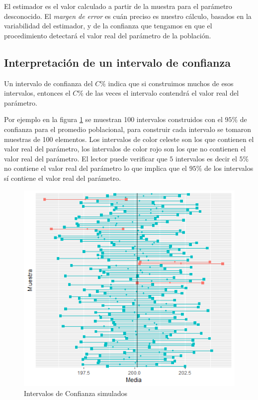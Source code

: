 \documentclass[]{book}
\begin{document}
El estimador es el valor calculado a partir de la muestra para el parámetro desconocido. El \emph{margen de error} es cuán preciso es nuestro cálculo, basados en la variabilidad del estimador, y de la confianza que tengamos en que el procedimiento detectará el valor real del parámetro de la población.

\hypertarget{interpretacion-de-un-intervalo-de-confianza}{%
\subsection{Interpretación de un intervalo de confianza}\label{interpretacion-de-un-intervalo-de-confianza}}

Un intervalo de confianza del \(C \%\) indica que si construimos muchos de esos intervalos, entonces el \(C \%\) de las veces el intervalo contendrá el valor real del parámetro.

Por ejemplo en la figura \ref{fig:ic} se muestran 100 intervalos construidos con el \(95 \%\) de confianza para el promedio poblacional, para construir cada intervalo se tomaron muestras de 100 elementos. Los intervalos de color celeste son los que contienen el valor real del parámetro, los intervalos de color rojo son los que no contienen el valor real del parámetro. El lector puede verificar que \(5\) intervalos es decir el \(5 \%\) no contiene el valor real del parámetro lo que implica que el \(95 \%\) de los intervalos sí contiene el valor real del parámetro.

\begin{figure}[h]

{\centering \includegraphics[width=0.7\linewidth]{ic} 

}

\caption{Intervalos de Confianza simulados}\label{fig:ic}
\end{figure}
\end{document}
